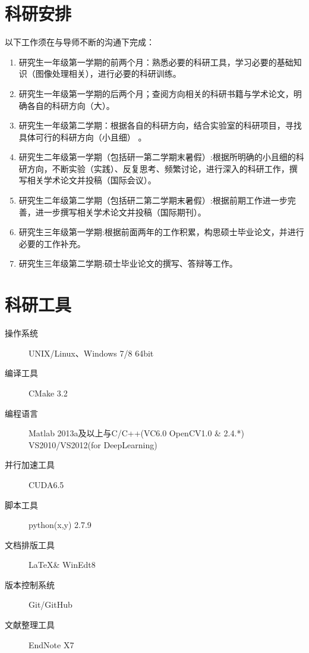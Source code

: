 \documentclass[a4paper，12pt]{article}
\begin{document}
\section{科研安排}

以下工作须在与导师不断的沟通下完成：

\begin{enumerate}

\item 研究生一年级第一学期的前两个月：熟悉必要的科研工具，学习必要的基础知识（图像处理相关），进行必要的科研训练。

\item 研究生一年级第一学期的后两个月；查阅方向相关的科研书籍与学术论文，明确各自的科研方向（大）。

\item 研究生一年级第二学期：根据各自的科研方向，结合实验室的科研项目，寻找具体可行的科研方向（小且细）
。

\item 研究生二年级第一学期（包括研一第二学期末暑假）:根据所明确的小且细的科研方向，不断实验（实践）、反复思考、频繁讨论，进行深入的科研工作，撰写相关学术论文并投稿（国际会议）。

\item 研究生二年级第二学期（包括研二第二学期末暑假）:根据前期工作进一步完善，进一步撰写相关学术论文并投稿（国际期刊）。

\item 研究生三年级第一学期:根据前面两年的工作积累，构思硕士毕业论文，并进行必要的工作补充。

\item 研究生三年级第二学期:硕士毕业论文的撰写、答辩等工作。

\end{enumerate}

\section{科研工具}

\begin{description}

\item[操作系统] UNIX/Linux、Windows 7/8 64bit

\item[编译工具] CMake 3.2

\item[编程语言] Matlab 2013a及以上与C/C++(VC6.0 OpenCV1.0 \& 2.4.*) VS2010/VS2012(for DeepLearning)

\item[并行加速工具] CUDA6.5

\item[脚本工具] python(x,y) 2.7.9

\item[文档排版工具] \LaTeX \& WinEdt8

\item[版本控制系统] Git/GitHub

\item[文献整理工具] EndNote X7

\end{description}
\end{document}
